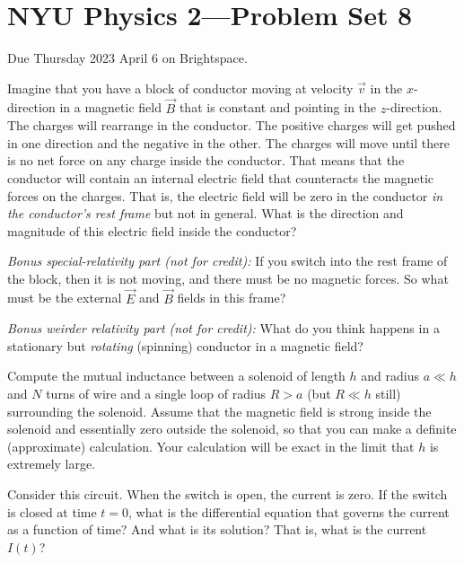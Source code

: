 \documentclass[12pt]{article}
\begin{document}
\section*{NYU Physics 2---Problem Set 8}

Due Thursday 2023 April 6 on Brightspace.

\startproblem%
Imagine that you have a block of conductor moving at velocity
$\vec{v}$ in the $x$-direction in a magnetic field $\vec{B}$ that is
constant and pointing in the $z$-direction. The charges will rearrange
in the conductor. The positive charges will get pushed in one
direction and the negative in the other.
The charges will move until there is no net force on any
charge inside the conductor.
That means that the conductor will
contain an internal electric field that counteracts the magnetic
forces on the charges.
That is, the electric field will be zero in the conductor \emph{in the conductor's rest frame} but not in general.
What is the direction and magnitude of this
electric field inside the conductor?

\textsl{Bonus special-relativity part (not for credit):} If you switch
into the rest frame of the block, then it is not moving, and there
must be no magnetic forces. So what must be the external $\vec{E}$ and
$\vec{B}$ fields in this frame?

\textsl{Bonus weirder relativity part (not for credit):} What do you
think happens in a stationary but \emph{rotating} (spinning) conductor in a magnetic
field?

\startproblem%
Compute the mutual
inductance between a solenoid of length $h$ and radius $a\ll h$ and
$N$ turns of wire and a single loop of radius $R>a$ (but $R\ll h$
still) surrounding the solenoid. Assume that the magnetic field is
strong inside the solenoid and essentially zero outside the solenoid,
so that you can make a definite (approximate) calculation. Your
calculation will be exact in the limit that $h$ is extremely large.

\startproblem%
Consider this circuit.
When the switch is open, the current is zero. If the switch is closed
at time $t=0$, what is the differential equation that governs the
current as a function of time? And what is its solution? That is,
what is the current $I(t)$?
\end{document}
